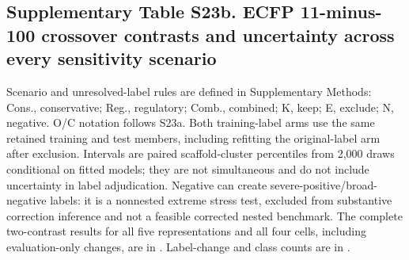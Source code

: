 \subsection*{Supplementary Table S23b. ECFP 11-minus-100 crossover contrasts and uncertainty across every sensitivity scenario}

Scenario and unresolved-label rules are defined in Supplementary Methods: Cons., conservative; Reg., regulatory; Comb., combined; K, keep; E, exclude; N, negative. O/C notation follows S23a. Both training-label arms use the same retained training and test members, including refitting the original-label arm after exclusion. Intervals are paired scaffold-cluster percentiles from 2,000 draws conditional on fitted models; they are not simultaneous and do not include uncertainty in label adjudication. Negative can create severe-positive/broad-negative labels: it is a nonnested extreme stress test, excluded from substantive correction inference and not a feasible corrected nested benchmark. The complete two-contrast results for all five representations and all four cells, including evaluation-only changes, are in . Label-change and class counts are in .

\begingroup\footnotesize\setlength{\tabcolsep}{4pt}

